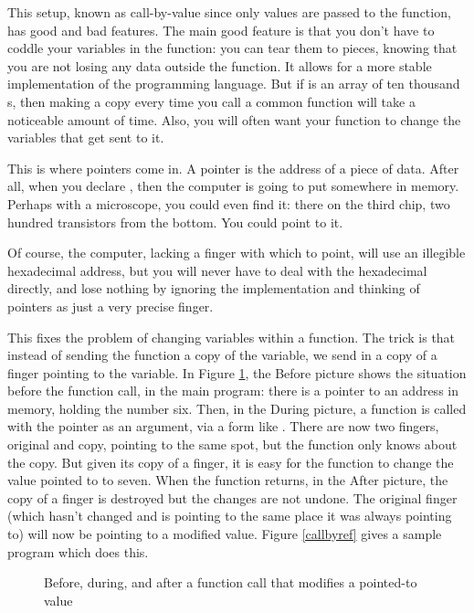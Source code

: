 \documentclass[12pt]{article}
\begin{document}
This setup, known as call-by-value since only values are passed to the
function, has good and bad features. The main good feature is that you
don't have to coddle your variables in the function: you can tear them to
pieces, knowing that you are not losing any data outside the function. It
allows for a more stable implementation of the programming language. But if 
is an array of ten thousand s, then making a copy every time
you call a common function will take a noticeable amount of time. Also,
you will often want your function to change the variables that get
sent to it.

This is where pointers come in. A pointer is the address of a piece of
data. After all, when you declare , then the computer is
going to put  somewhere in memory. Perhaps with a microscope,
you could even find it: there on the third chip, two hundred transistors
from the bottom. You could point to it.

Of course, the computer, lacking a finger with which to point, will use
an illegible hexadecimal address, but you will never have to deal with
the hexadecimal directly, and lose nothing by ignoring the implementation
and thinking of pointers as just a very precise finger.

This fixes the problem of changing variables within a function. The
trick is that instead of sending the function a copy of the variable,
we send in a copy of a finger pointing to the variable. 
In Figure \ref{fingerfig}, the Before picture shows the situation
before the function call, in the main program: there is a pointer to an
address in memory, holding the number six. Then, in the During picture,
a function is called with the pointer as an argument, via a form like
.
There are now
two fingers, original and copy, pointing to the same spot, but the
function only knows about the copy.  But given its copy of a finger, it
is easy for the function to change the value pointed to to seven. When
the function returns, in the After picture, the copy of a finger is
destroyed but the changes are not undone.  The original finger (which
hasn't changed and is pointing to the same place it was always pointing
to) will now be pointing to a modified value.  Figure \ref{callbyref}
gives a sample program which does this.

\begin{figure}
\hskip -1cm
\caption{Before, during, and after a function call that modifies a pointed-to value}
\label{fingerfig}
\end{figure}
\end{document}
